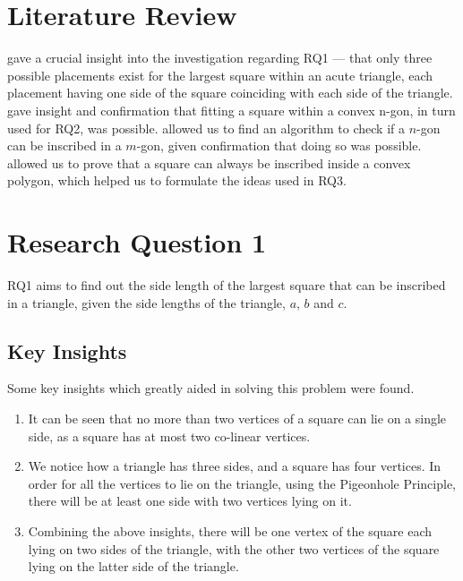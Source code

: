 \documentclass[12pt]{scrartcl}
\begin{document}
\section{Literature Review}
\cite{tbtb1} gave a crucial insight into the investigation regarding RQ1 — that only three possible placements exist for the largest square within an acute triangle, each placement having one side of the square coinciding with each side of the triangle.
\cite{chazelle} gave insight and confirmation that fitting a square within a convex n-gon, in turn used for RQ2, was possible.
\cite{dilworth} allowed us to find an algorithm to check if a $n$-gon can be inscribed in a $m$-gon, given confirmation that doing so was possible.
\cite{emch} allowed us to prove that a square can always be inscribed inside a convex polygon, which helped us to formulate the ideas used in RQ3.

\pagebreak

\section{Research Question 1}

RQ1 aims to find out the side length of the largest square that can be inscribed in a triangle,
given the side lengths of the triangle, $a$, $b$ and $c$.

\subsection{Key Insights}
Some key insights which greatly aided in solving this problem were found.
\begin{enumerate}
	\item It can be seen that no more than two vertices of a square can lie on a single side,
	      as a square has at most two co-linear vertices.
	\item We notice how a triangle has three sides, and a square has four vertices.
	      In order for all the vertices to lie on the triangle, using the Pigeonhole Principle,
	      there will be at least one side with two vertices lying on it.
	\item Combining the above insights, there will be one vertex of the square
	      each lying on two sides of the triangle, with the other two vertices of the square
	      lying on the latter side of the triangle.
\end{enumerate}
\end{document}
